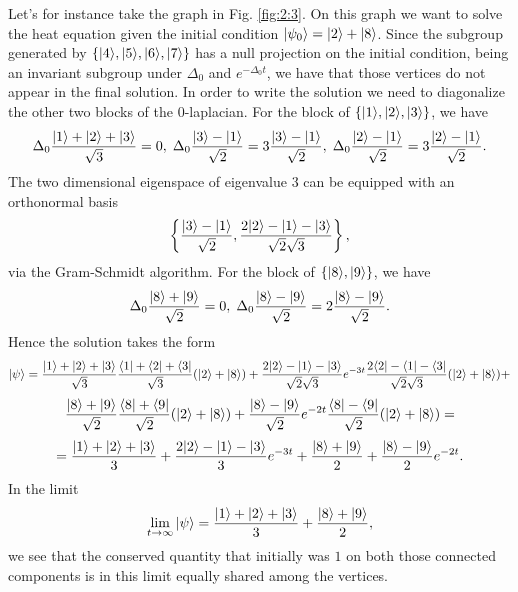 \documentclass[../2.tex]{subfiles}
\begin{document}
    \begin{exa}
        Let's for instance take the graph in Fig. \ref{fig:2:3}. On this graph we want to solve the heat equation given the initial condition
        $| \psi_0 \rangle = | 2 \rangle+| 8 \rangle$. Since the subgroup generated by $\{| 4 \rangle,| 5 \rangle,| 6 \rangle,| 7 \rangle\}$ has a null projection on the initial condition, being an 
        invariant subgroup under $\Delta_0$ and $e^{-\Delta_0 t}$, we have that those vertices do not appear in the final solution.
        In order to write the solution we need to diagonalize the other two blocks of the $0$-laplacian.
        For the block of $\{| 1 \rangle,| 2 \rangle,| 3 \rangle\}$, we have 
        \[ \Delta_0 \frac{| 1 \rangle+| 2 \rangle+| 3 \rangle}{\sqrt{3}} = 0 , \;
        \Delta_0 \frac{| 3 \rangle-| 1 \rangle}{\sqrt{2}} = 3 \frac{| 3 \rangle-| 1 \rangle}{\sqrt{2}}, \;
        \Delta_0 \frac{| 2 \rangle-| 1 \rangle}{\sqrt{2}} = 3 \frac{| 2 \rangle-| 1 \rangle}{\sqrt{2}}. \]
        The two dimensional eigenspace of eigenvalue $3$ can be equipped with an orthonormal basis 
        \[ \left\{ \frac{| 3 \rangle-| 1 \rangle}{\sqrt{2}}, \frac{2| 2 \rangle-| 1 \rangle-| 3 \rangle}{\sqrt{2}\sqrt{3}} \right\}, \]
        via the Gram-Schmidt algorithm.
        For the block of $\{| 8 \rangle,| 9 \rangle\}$, we have 
        \[ \Delta_0 \frac{| 8 \rangle+| 9 \rangle}{\sqrt{2}} = 0, \;
        \Delta_0 \frac{| 8 \rangle-| 9 \rangle}{\sqrt{2}} = 2 \frac{| 8 \rangle-| 9 \rangle}{\sqrt{2}}. \]
        Hence the solution takes the form
        \[ | \psi \rangle = \frac{| 1 \rangle+| 2 \rangle+| 3 \rangle}{\sqrt{3}}\frac{\langle 1 |+\langle 2 |+\langle 3 |}{\sqrt{3}}(| 2 \rangle+| 8 \rangle) + 
        \frac{2| 2 \rangle-| 1 \rangle-| 3 \rangle}{\sqrt{2}\sqrt{3}} e^{-3t}  \frac{2\langle 2 |-\langle 1 |-\langle 3 |}{\sqrt{2}\sqrt{3}}(| 2 \rangle+| 8 \rangle) + \]
        \[ \frac{| 8 \rangle+| 9 \rangle}{\sqrt{2}}\frac{\langle 8 |+\langle 9 |}{\sqrt{2}}(| 2 \rangle+| 8 \rangle) +
        \frac{| 8 \rangle-| 9 \rangle}{\sqrt{2}}e^{-2t}\frac{\langle 8 |-\langle 9 |}{\sqrt{2}}(| 2 \rangle+| 8 \rangle) =\]
        \[ = \frac{| 1 \rangle+| 2 \rangle+| 3 \rangle}{3}+ \frac{2| 2 \rangle-| 1 \rangle-| 3 \rangle}{3} e^{-3t} + \frac{| 8 \rangle+| 9 \rangle}{2} + \frac{| 8 \rangle-| 9 \rangle}{2}e^{-2t}. \]
        In the limit 
        \[ \lim_{t \to \infty} | \psi \rangle = \frac{| 1 \rangle+| 2 \rangle+| 3 \rangle}{3}+\frac{| 8 \rangle+| 9 \rangle}{2}, \]
        we see that the conserved quantity that initially was $1$ on both those connected components is in this 
        limit equally shared among the vertices.
    \end{exa}
    
\end{document}
